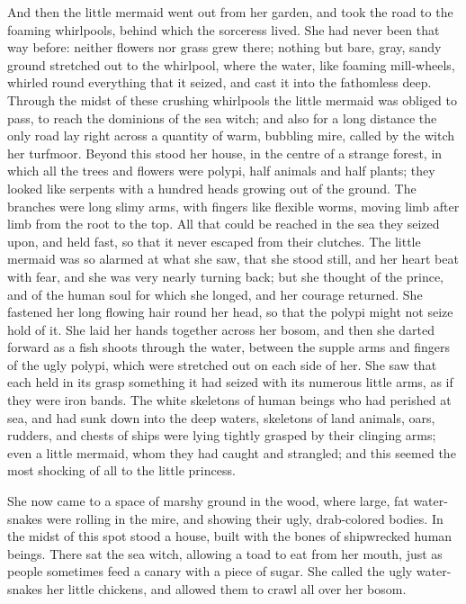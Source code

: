 And then the little mermaid went out from her garden, and took the
road to the foaming whirlpools, behind which the sorceress lived.
She had never been that way before: neither flowers nor grass grew
there; nothing but bare, gray, sandy ground stretched out to the
whirlpool, where the water, like foaming mill-wheels, whirled round
everything that it seized, and cast it into the fathomless deep.
Through the midst of these crushing whirlpools the little mermaid
was obliged to pass, to reach the dominions of the sea witch; and also
for a long distance the only road lay right across a quantity of warm,
bubbling mire, called by the witch her turfmoor. 
Beyond this stood her
house, in the centre of a strange forest, in which all the trees and
flowers were polypi, half animals and half plants; they looked like
serpents with a hundred heads growing out of the ground. 
The
branches were long slimy arms, with fingers like flexible worms,
moving limb after limb from the root to the top. 
All that could be
reached in the sea they seized upon, and held fast, so that it never
escaped from their clutches. 
The little mermaid was so alarmed at what
she saw, that she stood still, and her heart beat with fear, and she
was very nearly turning back; but she thought of the prince, and of
the human soul for which she longed, and her courage returned. 
She
fastened her long flowing hair round her head, so that the polypi
might not seize hold of it. 
She laid her hands together across her
bosom, and then she darted forward as a fish shoots through the water,
between the supple arms and fingers of the ugly polypi, which were
stretched out on each side of her. 
She saw that each held in its grasp
something it had seized with its numerous little arms, as if they were
iron bands. 
The white skeletons of human beings who had perished at
sea, and had sunk down into the deep waters, skeletons of land
animals, oars, rudders, and chests of ships were lying tightly grasped
by their clinging arms; even a little mermaid, whom they had caught
and strangled; and this seemed the most shocking of all to the
little princess.

She now came to a space of marshy ground in the wood, where large,
fat water-snakes were rolling in the mire, and showing their ugly,
drab-colored bodies. 
In the midst of this spot stood a house, built
with the bones of shipwrecked human beings. 
There sat the sea witch,
allowing a toad to eat from her mouth, just as people sometimes feed a
canary with a piece of sugar. 
She called the ugly water-snakes her
little chickens, and allowed them to crawl all over her bosom.

